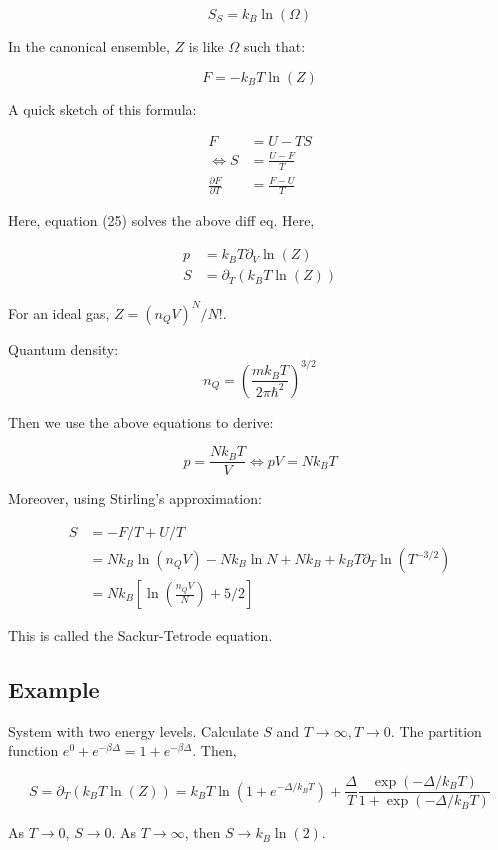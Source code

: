 \documentclass{article}
\newtheorem{one minute paper}[theorem]{One Minute Paper}
\begin{document}
\begin{equation}
    S_S = k_B \ln(\Omega)
\end{equation}

In the canonical ensemble, $Z$ is like $\Omega$ such that:

\begin{equation}
    F = -k_B T \ln(Z)
\end{equation}

A quick sketch of this formula:

\begin{align}
    F &= U - TS \\
    \iff S &= \frac{U - F}{T} \\
    \frac{\partial F}{\partial T} &= \frac{F - U}{T}
\end{align}

Here, equation (25) solves the above diff eq. Here, 

\begin{align}
    p &= k_B T \partial_{V}\ln (Z) \\
    S &= \partial_{T}(k_B T \ln(Z))
\end{align}

For an ideal gas, $Z = (n_Q V)^N/N!$. 

Quantum density:
\begin{equation}
    n_Q = \left( \frac{mk_B T}{2\pi \hbar^2} \right)^{3/2}
\end{equation}

Then we use the above equations to derive:

\begin{equation}
    p = \frac{ Nk_B T}{V} \iff pV = Nk_B T 
\end{equation}

Moreover, using Stirling's approximation:

\begin{align}
    S &= -F/T + U/T \\
    &= N k_B \ln(n_Q V) - Nk_B \ln N + N k_B + k_B T \partial_T \ln(T^{-3/2}) \\
    &= Nk_B \left[ \ln \left( \frac{n_Q V}{N} \right) + 5/2 \right]
\end{align}

This is called the Sackur-Tetrode equation. 

\subsection*{Example}

System with two energy levels. Calculate $S$ and $T \rightarrow \infty, T \rightarrow 0$. The partition function $e^0 + e^{-\beta \Delta} = 1 + e^{-\beta \Delta}$. Then, 

\begin{equation}
    S = \partial_T \left( k_B T \ln(Z) \right) = k_B T\ln\left( 1 + e^{-\Delta /k_B T} \right) + \frac{\Delta}{T}\frac{\exp(-\Delta/k_B T)}{1 + \exp(-\Delta/k_B T)}
\end{equation}

As $T \rightarrow 0$, $S \rightarrow 0$. As $T \rightarrow \infty$, then $S \rightarrow k_B \ln(2)$. 
\end{document}
